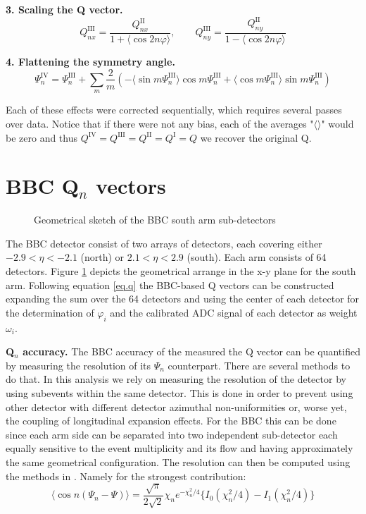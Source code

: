 \documentclass{article}
\begin{document}
{\bf 3. Scaling the Q vector.}
\begin{equation}
Q^\mathrm{III}_{nx} = \frac{Q^\mathrm{II}_{nx}}{1+\langle\cos{2n\varphi}\rangle}, \qquad
Q^\mathrm{III}_{ny} = \frac{Q^\mathrm{II}_{ny}}{1-\langle\cos{2n\varphi}\rangle}
\end{equation}

{\bf 4. Flattening the symmetry angle.}
\begin{equation}
\Psi^\mathrm{IV}_{n} = \Psi^\mathrm{III}_{n} + \sum_{m}\frac{2}{m}( -\langle\sin{m\Psi^\mathrm{III}_n}\rangle\cos{m\Psi^\mathrm{III}_n} +\langle\cos{m\Psi^\mathrm{III}_n}\rangle\sin{m\Psi^\mathrm{III}_n})
\end{equation}

Each of these effects were corrected sequentially, which requires several passes over data. Notice that if there were not any bias, each of the averages "$\langle\rangle$" would be zero and thus $Q^\mathrm{IV}=Q^\mathrm{III}=Q^\mathrm{II}=Q^\mathrm{I}=Q$ we recover the original Q.

\section{BBC Q$_n$ vectors}
\begin{figure}
\label{fig.bbcgeo}
\caption{Geometrical sketch of the BBC south arm sub-detectors}
\end{figure}
The BBC detector consist of two arrays of detectors, each covering either $-2.9<\eta<-2.1$ (north) or $2.1<\eta<2.9$ (south).
Each arm consists of 64 detectors. Figure \ref{fig.bbcgeo} depicts the geometrical arrange in the x-y plane for the south arm.
Following equation \ref{eq.q} the BBC-based Q vectors can be constructed expanding the sum over the 64 detectors and using the center of each detector for the determination of $\varphi_i$ and the calibrated ADC signal of each detector as weight $\omega_i$.

{\bf Q$_n$ accuracy.}
The BBC accuracy of the measured the Q vector can be quantified by measuring the resolution of its $\Psi_n$ counterpart.
There are several methods to do that. In this analysis we rely on measuring the resolution of the detector by using subevents within the same detector. This is done in order to prevent using other detector with different detector azimuthal non-uniformities or, worse yet, the coupling of longitudinal expansion effects.
For the BBC this can be done since each arm side can be separated into two independent sub-detector each equally sensitive to the event multiplicity and its flow and having approximately the same geometrical configuration.
The resolution can then be computed using the methods in \cite{PhysRevC.77.034904}. Namely for the strongest contribution:
\begin{equation}
\langle\cos{n(\Psi_n-\Psi)}\rangle = \frac{\sqrt{\pi}}{2\sqrt{2}}\chi_n e^{-\chi_n^2/4}\lbrace I_0(\chi_n^2/4)-I_1(\chi_n^2/4)\rbrace
\end{equation}
\end{document}
